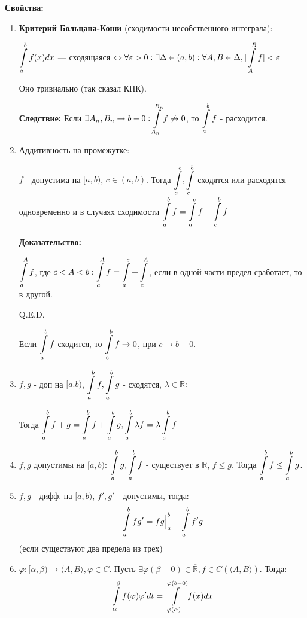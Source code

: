 \textbf{Свойства:}
\begin{enumerate}
    \item \textbf{Критерий Больцана-Коши} (сходимости несобственного интеграла):
  
  $\displaystyle\int\limits_{a}^{b}f(x)dx$ --- сходящаяся $\Leftrightarrow \forall \varepsilon >0:\exists \Delta \in (a,b): \forall A,B\in \Delta,  |\displaystyle\int\limits_{A}^{B}f|< \varepsilon$
  
  Оно тривиально (так сказал КПК).

  \textbf{Следствие:} Если $\exists A_n,B_n \rightarrow b-0: \displaystyle\int\limits_{A_n}^{B_n}f \not \rightarrow 0$, то $\displaystyle\int\limits_{a}^{b}f$ - расходится.

  \item Аддитивность на промежутке:

$f$ - допустима на $[a,b)$, $c \in (a,b)$. Тогда $\displaystyle\int\limits_{a}^{c}, \displaystyle\int\limits_{c}^{b}$ сходятся или расходятся одновременно и в случаях сходимости $\displaystyle\int\limits_{a}^{b}f = \displaystyle\int\limits_{a}^{c}f + \displaystyle\int\limits_{c}^{b}f$

\textbf{Доказательство:}

$\displaystyle\int\limits_{a}^{A}f$, где $c<A<b: \displaystyle\int\limits_{a}^{A}f = \displaystyle\int\limits_{a}^{c}+\displaystyle\int\limits_{c}^{A}$, если в одной части предел сработает, то в другой.

\hfill Q.E.D.

Если $\displaystyle\int\limits_{a}^{b}f$ сходится, то $\displaystyle\int\limits_{c}^{b} f \rightarrow 0$, при $c\rightarrow b - 0$.

\item $f,g$ - доп на $[a.b)$, $\displaystyle\int\limits_{a}^{b}f,\displaystyle\int\limits_{a}^{b}g$ - сходятся, $\lambda\in \mathbb{R}:$

Тогда $\displaystyle\int\limits_{a}^{b}f +g = \displaystyle\int\limits_{a}^{b}f + \displaystyle\int\limits_{a}^{b}g, \displaystyle\int\limits_{a}^{b}\lambda f = \lambda \displaystyle\int\limits_{a}^{b}f$

\item  $f,g$ допустимы на $[a,b)$: $\displaystyle\int\limits_{a}^{b}g,\displaystyle\int\limits_{a}^{b}f$ - существует в $\mathbb{R}$, $f\leq g$. Тогда $\displaystyle\int\limits_{a}^{b}f \leq \displaystyle\int\limits_{a}^{b}g$.

\item $f,g$ - дифф. на $[a,b)$, $f',g'$ - допустимы, тогда:
$$\displaystyle\int\limits_{a}^{b}fg' = fg\Big|_a^b - \displaystyle\int\limits_{a}^{b}f'g$$
(если существуют два предела из трех)

\item $\varphi: [\alpha, \beta) \rightarrow \langle A, B \rangle, \varphi \in C.$ Пусть $\exists \varphi(\beta-0)\in \overline{\mathbb{R}}, f\in C(\langle A,B\rangle)$. Тогда:
$$\displaystyle\int\limits_{\alpha}^{\beta}f(\varphi)\varphi'dt = \displaystyle\int\limits_{\varphi(\alpha)}^{\varphi(b-0)}f(x) dx$$

\end{enumerate}

